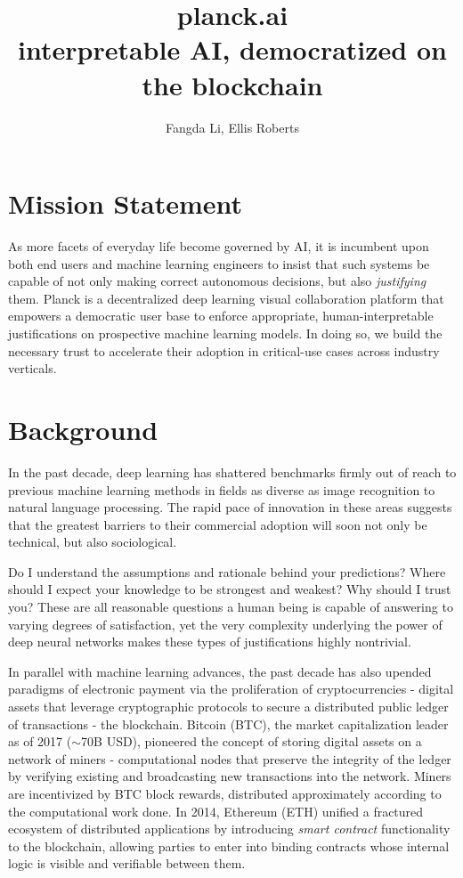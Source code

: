 \documentclass[12pt]{article}
\begin{document}
\title{planck.ai \\ \large interpretable AI, democratized on the blockchain}
\date{}
\author{Fangda Li, Ellis Roberts}
\maketitle

\tableofcontents

\section{Mission Statement}
As more facets of everyday life become governed by AI, it is incumbent upon both end users and machine learning engineers to insist that such systems be capable of not only making correct autonomous decisions, but also \emph{justifying} them.  Planck is a decentralized deep learning visual collaboration platform that empowers a democratic user base to enforce appropriate, human-interpretable justifications on prospective machine learning models.  In doing so, we build the necessary trust to accelerate their adoption in critical-use cases across industry verticals.

\section{Background}
In the past decade, deep learning has shattered benchmarks firmly out of reach to previous machine learning methods in fields as diverse as image recognition to natural language processing.  The rapid pace of innovation in these areas suggests that the greatest barriers to their commercial adoption will soon not only be technical, but also sociological.

Do I understand the assumptions and rationale behind your predictions?  Where should I expect your knowledge to be strongest and weakest?  Why should I trust you?  These are all reasonable questions a human being is capable of answering to varying degrees of satisfaction, yet the very complexity underlying the power of deep neural networks makes these types of justifications highly nontrivial.  

In parallel with machine learning advances, the past decade has also upended paradigms of electronic payment via the proliferation of cryptocurrencies -  digital assets that leverage cryptographic protocols to secure a distributed public ledger of transactions - the blockchain.  Bitcoin (BTC), the market capitalization leader as of 2017 ($\sim$70B USD), pioneered the concept of storing digital assets on a network of miners - computational nodes that preserve the integrity of the ledger by verifying existing and broadcasting new transactions into the network.  Miners are incentivized by BTC block rewards, distributed approximately according to the computational work done.  In 2014, Ethereum (ETH) unified a fractured ecosystem of distributed applications by introducing \emph{smart contract} functionality to the blockchain, allowing parties to enter into binding contracts whose internal logic is visible and verifiable between them.
\end{document}
